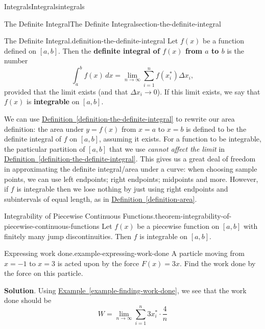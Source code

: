 \documentclass[oneside,10pt,]{book}
\newcommand{\terminology}[1]{\textbf{#1}}
\numberwithin{equation}{section}
\begin{document}
\begin{chapterptx}{Integrals}{}{Integrals}{}{}{integrals}
\begin{sectionptx}{The Definite Integral}{}{The Definite Integral}{}{}{section-the-definite-integral}
\begin{definition}{The Definite Integral.}{definition-the-definite-integral}%
\hypertarget{p-427}{}%
Let \(f(x)\) be a function defined on \([a,b]\). Then the \terminology{definite integral of \(f(x)\) from \(a\) to \(b\)} is the number%
\begin{equation*}
\int_{a}^{b}f(x)\,dx = \lim_{n\to\infty}\sum_{i=1}^{n}f(x_{i}^{*})\Delta x_{i},
\end{equation*}
provided that the limit exists (and that \(\Delta x_{i}\to0\)). If this limit exists, we say that \(f(x)\) is \terminology{integrable} on \([a,b]\).%
\end{definition}
\hypertarget{p-428}{}%
We can use \hyperref[definition-the-definite-integral]{Definition~\ref{definition-the-definite-integral}} to rewrite our area definition: the area under \(y=f(x)\) from \(x=a\) to \(x=b\) is defined to be the definite integral of \(f\) on \([a,b]\), assuming it exists. For a function to be integrable, the particular partition of \([a,b]\) that we use \emph{cannot affect the limit} in \hyperref[definition-the-definite-integral]{Definition~\ref{definition-the-definite-integral}}. This gives us a great deal of freedom in approximating the definite integral\slash{}area under a curve: when choosing sample points, we can use left endpoints; right endpoints; midpoints and more. However, if \(f\) is integrable then we lose nothing by just using right endpoints and subintervals of equal length, as in \hyperref[definition-area]{Definition~\ref{definition-area}}.%
\begin{theorem}{Integrability of Piecewise Continuous Functions.}{}{theorem-integrability-of-piecewise-continuous-functions}%
\hypertarget{p-429}{}%
Let \(f(x)\) be a piecewise function on \([a,b]\) with finitely many jump discontinuities. Then \(f\) is integrable on \([a,b]\).%
\end{theorem}
\begin{example}{Expressing work done.}{example-expressing-work-done}%
\hypertarget{p-430}{}%
A particle moving from \(x=-1\) to \(x=3\) is acted upon by the force \(F(x) = 3x\). Find the work done by the force on this particle.%
\par\smallskip%
\noindent\textbf{Solution}.\hypertarget{solution-94}{}\quad%
\hypertarget{p-431}{}%
Using \hyperref[example-finding-work-done]{Example~\ref{example-finding-work-done}}, we see that the work done should be%
\begin{equation*}
W = \lim_{n\to\infty}\sum_{i=1}^{n}3x_{i}^{*}\cdot\frac{4}{n}
\end{equation*}

\end{example}
\end{sectionptx}
\end{chapterptx}
\end{document}
